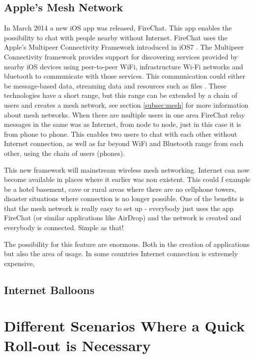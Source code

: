 \subsection{Apple's Mesh Network}
In March 2014 a new iOS app was released, FireChat. This app enables the possibility to chat with people nearby without Internet. FireChat uses the Apple's Multipeer Connectivity Framework introduced in iOS7 \cite{appleMesh}. The Multipeer Connectivity framework provides support for discovering services provided by nearby iOS devices using peer-to-peer WiFi, infrastructure Wi-Fi networks and bluetooth to communicate with those services. This communication could either be message-based data, streaming data and resources such as files \cite{multipeer}.
These technologies have a short range, but this range can be extended by a chain of users and creates a mesh network, see section \ref{subsec:mesh} for more information about mesh networks. When there are multiple users in one area FireChat relay messages in the same was as Internet, from node to node, just in this case it is from phone to phone.  This enables two users to chat with each other without Internet connection, as well as far beyond WiFi and Bluetooth range from each other, using the chain of users (phones).

This new framework will mainstream wireless mesh networking. Internet can now become available in places where it earlier was non existent. This could f example be a hotel basement, cave or rural areas where there are no cellphone towers, disaster situations where connection is no longer possible. One of the benefits is that the mesh network is really easy to set up - everybody just uses the app FireChat (or similar applications like AirDrop) and the network is created and everybody is connected. Simple as that! 

The possibility for this feature are enormous. Both in the creation of applications but also the area of usage. In some countries Internet connection is extremely expensive,  


\subsection{Internet Balloons}


\section{Different Scenarios Where a Quick Roll-out is Necessary}

